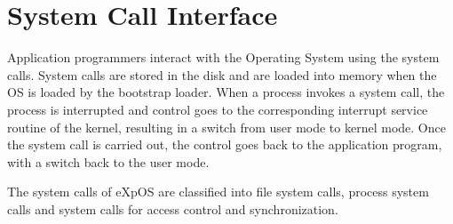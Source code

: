 \chapter{System Call Interface}
\label{chap7}


Application programmers interact with the Operating System using the system calls. System calls are stored in the disk and are loaded into memory when the OS is loaded by the bootstrap loader. When a process invokes a system call, the process is interrupted and control goes to the corresponding interrupt service routine of the kernel, resulting in a switch from user mode to kernel mode. Once the system call is carried out, the control goes back to the application program, with a switch back to the user mode.

The system calls of eXpOS are classified into file system calls, process system calls and system calls for access control and synchronization.

